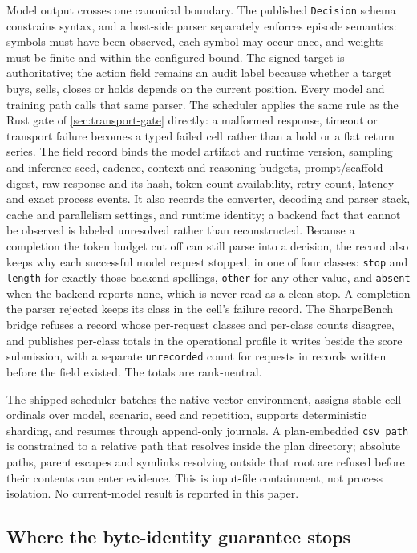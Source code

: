 Model output crosses one canonical boundary. The published \texttt{Decision} schema constrains syntax, and a host-side parser separately enforces episode semantics: symbols must have been observed, each symbol may occur once, and weights must be finite and within the configured bound. The signed target is authoritative; the action field remains an audit label because whether a target buys, sells, closes or holds depends on the current position. Every model and training path calls that same parser. The scheduler applies the same rule as the Rust gate of \cref{sec:transport-gate} directly: a malformed response, timeout or transport failure becomes a typed failed cell rather than a hold or a flat return series. The field record binds the model artifact and runtime version, sampling and inference seed, cadence, context and reasoning budgets, prompt/scaffold digest, raw response and its hash, token-count availability, retry count, latency and exact process events. It also records the converter, decoding and parser stack, cache and parallelism settings, and runtime identity; a backend fact that cannot be observed is labeled unresolved rather than reconstructed. Because a completion the token budget cut off can still parse into a decision, the record also keeps why each successful model request stopped, in one of four classes: \texttt{stop} and \texttt{length} for exactly those backend spellings, \texttt{other} for any other value, and \texttt{absent} when the backend reports none, which is never read as a clean stop. A completion the parser rejected keeps its class in the cell's failure record. The SharpeBench bridge refuses a record whose per-request classes and per-class counts disagree, and publishes per-class totals in the operational profile it writes beside the score submission, with a separate \texttt{unrecorded} count for requests in records written before the field existed. The totals are rank-neutral.

The shipped scheduler batches the native vector environment, assigns stable cell ordinals over model, scenario, seed and repetition, supports deterministic sharding, and resumes through append-only journals. A plan-embedded \texttt{csv\_path} is constrained to a relative path that resolves inside the plan directory; absolute paths, parent escapes and symlinks resolving outside that root are refused before their contents can enter evidence. This is input-file containment, not process isolation. No current-model result is reported in this paper.

\subsection{Where the byte-identity guarantee stops}\label{sec:agentic-trust}

